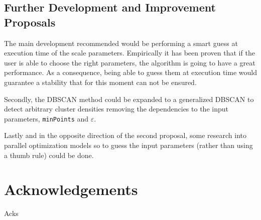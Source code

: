 \documentclass[10pt,journal,compsoc]{IEEEtran}
\begin{document}
\subsection{Further Development and Improvement Proposals} \label{further_development}
The main development recommended would be performing a smart guess at execution time of the scale parameters. Empirically it has been proven that if the user is able to choose the right parameters, the algorithm is going to have a great performance. As a consequence, being able to guess them at execution time would guarantee a stability that for this moment can not be ensured.

Secondly, the DBSCAN method could be expanded to a generalized DBSCAN to detect arbitrary cluster densities removing the dependencies to the input parameters, \texttt{minPoints} and $\varepsilon$.

Lastly and in the opposite direction of the second proposal, some research into parallel optimization models so to guess the input parameters (rather than using a thumb rule) could be done.



\section*{Acknowledgements}

Acks


\end{document}
